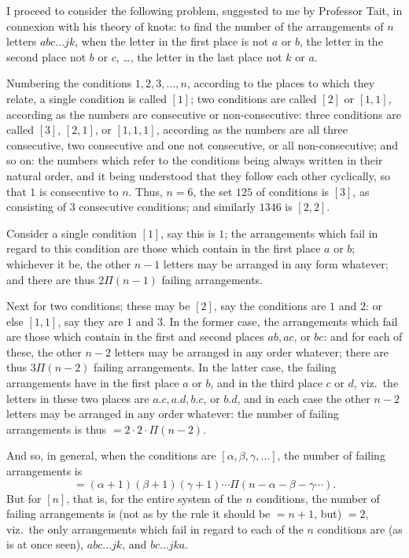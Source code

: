 \documentclass[11pt,a4paper]{article}
\begin{document}
\medskip

I proceed to consider the following problem, suggested to me by Professor Tait, in connexion with his theory of knots: to find the number of the arrangements of $n$ letters $abc \ldots jk$, when the letter in the first place is not $a$ or $b$, the letter in the second place not $b$ or $c$, \ldots, the letter in the last place not $k$ or $a$.

\newpage


\noindent Numbering the conditions $1, 2, 3, \ldots, n$, according to the places to which they relate, a single condition is called $[1]$; two conditions are called $[2]$ or $[1, 1]$, according as the numbers are consecutive or non-consecutive: three conditions are called $[3]$, $[2, 1]$, or $[1, 1, 1]$, according as the numbers are all three consecutive, two consecutive and one not consecutive, or all non-consecutive; and so on: the numbers which refer to the conditions being always written in their natural order, and it being understood that they follow each other cyclically, so that $1$ is consecutive to $n$. Thus, $n = 6$, the set $125$ of conditions is $[3]$, as consisting of $3$ consecutive conditions; and similarly $1346$ is $[2, 2]$.

\medskip

Consider a single condition $[1]$, say this is $1$; the arrangements which fail in regard to this condition are those which contain in the first place $a$ or $b$; whichever it be, the other $n - 1$ letters may be arranged in any form whatever; and there are thus $2\Pi(n - 1)$ failing arrangements.

\medskip

Next for two conditions; these may be $[2]$, say the conditions are $1$ and $2$: or else $[1, 1]$, say they are $1$ and $3$. In the former case, the arrangements which fail are those which contain in the first and second places $ab, ac$, or $bc$: and for each of these, the other $n - 2$ letters may be arranged in any order whatever; there are thus $3\Pi(n - 2)$ failing arrangements. In the latter case, the failing arrangements have in the first place $a$ or $b$, and in the third place $c$ or $d$, viz.\ the letters in these two places are $a.c, a.d, b.c$, or $b.d$, and in each case the other $n - 2$ letters may be arranged in any order whatever: the number of failing arrangements is thus $= 2\cdot 2\cdot \Pi(n - 2)$.

And so, in general, when the conditions are $[\alpha, \beta, \gamma, \ldots]$, the number of failing arrangements is
\[
= (\alpha + 1)(\beta + 1)(\gamma + 1)\cdots \Pi(n - \alpha - \beta - \gamma\cdots).
\]
But for $[n]$, that is, for the entire system of the $n$ conditions, the number of failing arrangements is (not as by the rule it should be $= n + 1$, but) $= 2$, viz.\ the only arrangements which fail in regard to each of the $n$ conditions are (as is at once seen), $abc\ldots jk$, and $bc\ldots jka$.
\end{document}
